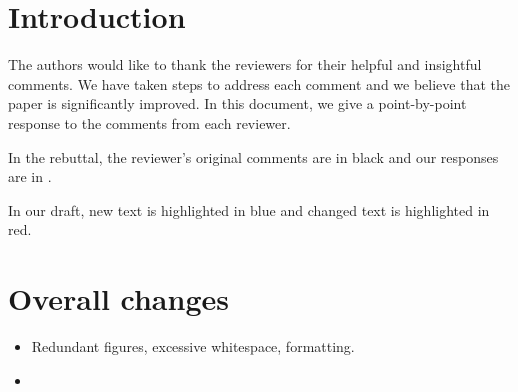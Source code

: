 \documentclass{vldb}
\newcommand{\resp}[1]{{\color{blue}{#1}}}
\begin{document}
\section{Introduction}
The authors would like to thank the reviewers for their helpful and insightful comments.
We have taken steps to address each comment and we believe that the paper is significantly improved.
In this document, we give a point-by-point response to the comments from each reviewer.

In the rebuttal, the reviewer's original comments are in black and our responses are in \resp{blue}.

In our draft, new text is highlighted in {\color{blue}blue} and changed text is highlighted in {\color{red}red}.

\section{Overall changes}
\begin{itemize}
\item Redundant figures, excessive whitespace, formatting.
  
  \resp{Several reviewers commented on the amount of whitespace, so we've compressed many of the figures and removed whitespace to make room for additional material.}
  
\item \resp{
    We have improved our system since the paper was submitted by adding imputation for categorical variables.
    This has a minor impact on the experimental results.
    It improves the ability of the regression tree model to perform imputation by making these variables available to the model.
  }
\end{itemize}
\end{document}
